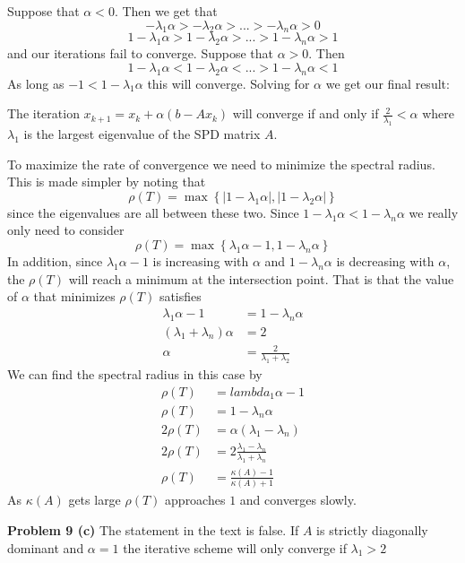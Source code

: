 \documentclass[12pt]{article}
\newcommand{\problem}[1]{\hspace{-4 ex} \large \textbf{Problem #1} }
\begin{document}
Suppose that $\alpha < 0$. Then we get that 
$$
- \lambda_1 \alpha > - \lambda_2 \alpha > ... > - \lambda_n \alpha > 0
$$
$$
1 - \lambda_1 \alpha > 1 - \lambda_2 \alpha > ... > 1 - \lambda_n \alpha > 1
$$
and our iterations fail to converge.
Suppose that $\alpha > 0$. Then
$$
1 - \lambda_1 \alpha < 1 - \lambda_2 \alpha < ... > 1 - \lambda_n \alpha < 1
$$
As long as $-1 < 1 - \lambda_1 \alpha $ this will converge. Solving for $\alpha$ we get our final result: \bigbreak

The iteration $x_{k+1} = x_k + \alpha(b-Ax_k)$ will converge if and only if $\frac{2}{\lambda_1} < \alpha$ where $\lambda_1$ is the largest eigenvalue of the SPD matrix $A$. \bigbreak

To maximize the rate of convergence we need to minimize the spectral radius. This is made simpler by noting that 
$$
\rho(T) = \max \left\{  \left\vert 1- \lambda_1\alpha \right\vert, \left\vert 1 - \lambda_2\alpha\right\vert \right \}
$$
since the eigenvalues are all between these two. Since $1-\lambda_1\alpha < 1 - \lambda_n\alpha$ we really only need to consider
$$
\rho(T) = \max \left\{  \lambda_1\alpha - 1 , 1 - \lambda_n\alpha \right \}
$$
In addition, since $\lambda_1\alpha - 1$ is increasing with $\alpha$ and $1 - \lambda_n\alpha$ is decreasing with $\alpha$, the $\rho(T)$ will reach a minimum at the intersection point. That is that the value of $\alpha$ that minimizes $\rho(T)$ satisfies
\begin{align*}
	\lambda_1\alpha - 1 & = 1 - \lambda_n\alpha \\
	(\lambda_1 + \lambda_n )\alpha & = 2 \\
	\alpha & = \frac{2}{\lambda_1 + \lambda_2}
\end{align*}
We can find the spectral radius in this case by
\begin{align*}
	\rho(T) & = lambda_1\alpha - 1 \\
	\rho(T) & = 1 - \lambda_n\alpha \\
	2 \rho(T) & = \alpha(\lambda_1 - \lambda_n) \\
	2 \rho(T) & = 2 \frac{\lambda_1 - \lambda_n}{\lambda_1 + \lambda_n} \\
	\rho(T) & = \frac{\kappa(A) - 1}{\kappa(A)+1}
\end{align*}
As $\kappa(A)$ gets large $\rho(T)$ approaches $1$ and converges slowly. 

\bigbreak

\problem{9 (c)} The statement in the text is false. If $A$ is strictly diagonally dominant and $\alpha = 1$ the iterative scheme will only converge if $\lambda_1 > 2$
\end{document}
